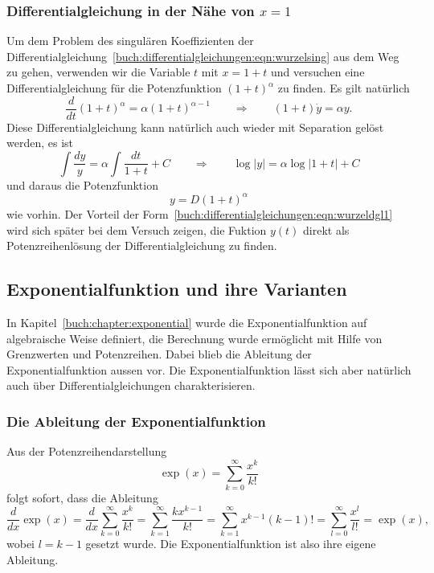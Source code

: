 \subsubsection{Differentialgleichung in der Nähe von $x=1$}
Um dem Problem des singulären Koeffizienten der
Differentialgleichung~\eqref{buch:differentialgleichungen:eqn:wurzelsing}
aus dem Weg zu gehen, verwenden wir die Variable $t$ mit $x=1+t$ und
versuchen eine Differentialgleichung für die Potenzfunktion
$(1+t)^\alpha$ zu finden.
Es gilt natürlich
\begin{equation}
\frac{d}{dt} (1+t)^\alpha
=
\alpha (1+t)^{\alpha-1}
\qquad\Rightarrow\qquad
(1+t) \dot{y} = \alpha y.
\label{buch:differentialgleichungen:eqn:wurzeldgl1}
\end{equation}
Diese Differentialgleichung kann natürlich auch wieder mit Separation
gelöst werden, es ist
\begin{equation}
\int
\frac{dy}{y} 
=
\alpha
\int
\frac{dt}{1+t}
+
C
\qquad\Rightarrow\qquad
\log|y| = \alpha \log|1+t| + C
\label{buch:differentialgleichungen:eqn:wurzeldgl1loesung}
\end{equation}
und daraus die Potenzfunktion
\[
y=D(1+t)^\alpha
\]
wie vorhin.
Der Vorteil der
Form~\eqref{buch:differentialgleichungen:eqn:wurzeldgl1}
wird sich später bei dem Versuch zeigen, die Fuktion $y(t)$
direkt als Potenzreihenlösung der Differentialgleichung zu finden.


\subsection{Exponentialfunktion und ihre Varianten
\label{buch:differentialgleichungen:subsection:exponentialfunktion}}
In Kapitel~\ref{buch:chapter:exponential} wurde die Exponentialfunktion
auf algebraische Weise definiert, die Berechnung wurde ermöglicht
mit Hilfe von Grenzwerten und Potenzreihen.
Dabei blieb die Ableitung der Exponentialfunktion aussen vor.
Die Exponentialfunktion lässt sich aber natürlich auch über
Differentialgleichungen charakterisieren.

\subsubsection{Die Ableitung der Exponentialfunktion}
Aus der Potenzreihendarstellung
\[
\exp(x)
=
\sum_{k=0}^\infty \frac{x^k}{k!}
\]
folgt sofort, dass die Ableitung
\[
\frac{d}{dx}\exp(x)
=
\frac{d}{dx}
\sum_{k=0}^\infty
\frac{x^k}{k!}
=
\sum_{k=1}^\infty \frac{kx^{k-1}}{k!}
=
\sum_{k=1}^\infty{x^{k-1}}{(k-1)!}
=
\sum_{l=0}^\infty \frac{x^l}{l!}
=
\exp(x),
\]
wobei $l=k-1$ gesetzt wurde.
Die Exponentialfunktion ist also ihre eigene Ableitung.

